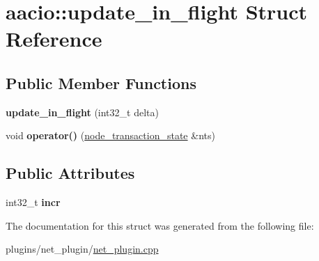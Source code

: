 \hypertarget{structaacio_1_1update__in__flight}{}\section{aacio\+:\+:update\+\_\+in\+\_\+flight Struct Reference}
\label{structaacio_1_1update__in__flight}
\subsection*{Public Member Functions}
\begin{DoxyCompactItemize}
\item 
\mbox{\label{structaacio_1_1update__in__flight_a82562c1ff4f1dfeae72eac217e2cb7f2}} 
{\bfseries update\+\_\+in\+\_\+flight} (int32\+\_\+t delta)
\item 
\mbox{\label{structaacio_1_1update__in__flight_af1860291b09883a9aa11cab857c173e4}} 
void {\bfseries operator()} (\mbox{\hyperlink{structaacio_1_1node__transaction__state}{node\+\_\+transaction\+\_\+state}} \&nts)
\end{DoxyCompactItemize}
\subsection*{Public Attributes}
\begin{DoxyCompactItemize}
\item 
\mbox{\label{structaacio_1_1update__in__flight_aa8f13d59eb232d538b8fa054bdf3f765}} 
int32\+\_\+t {\bfseries incr}
\end{DoxyCompactItemize}


The documentation for this struct was generated from the following file\+:\begin{DoxyCompactItemize}
\item 
plugins/net\+\_\+plugin/\mbox{\hyperlink{net__plugin_8cpp}{net\+\_\+plugin.\+cpp}}\end{DoxyCompactItemize}
